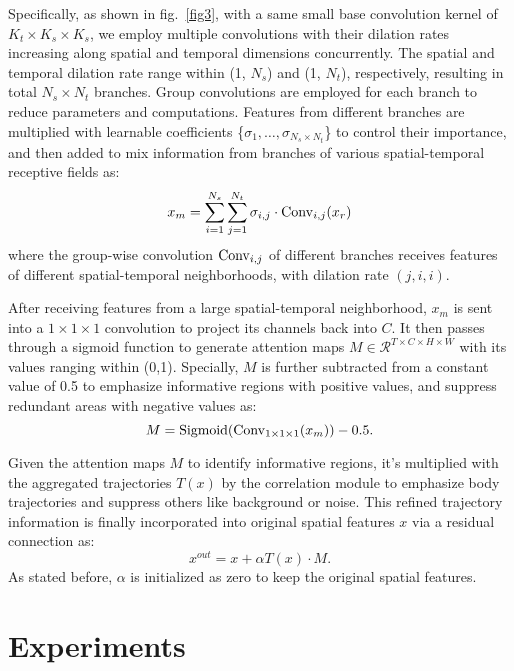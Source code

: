 \documentclass[10pt,twocolumn,letterpaper]{article}
\begin{document}
Specifically, as shown in fig.~\ref{fig3}, with a same small base convolution kernel of $K_t \times K_s \times K_s$, we employ multiple convolutions with their dilation rates increasing along spatial and temporal dimensions concurrently. The spatial and temporal dilation rate range within (1, $N_s$) and (1, $N_t$), respectively, resulting in total $N_s\times N_t$ branches. Group convolutions are employed for each branch to reduce parameters and computations. Features from different branches are multiplied with learnable coefficients \{$\sigma_1, \dots, \sigma_{N_s\times N_t}$\} to control their importance, and then added to mix information from branches of various spatial-temporal receptive fields as:
\begin{equation}
  \label{e6}
    x_m = \sum_{i=1}^{N_s}\sum_{j=1}^{N_t}{\sigma_{i,j} \cdot {\rm Conv}_{i,j}(x_r)}
\end{equation}
where the group-wise convolution ${\rm Conv}_{i,j}$ of different branches receives features of different spatial-temporal neighborhoods, with dilation rate $(j, i, i)$.

After receiving features from a large spatial-temporal neighborhood, $x_m$ is sent into a $1\times 1 \times 1$ convolution to project its channels back into $C$. It then passes through a sigmoid function to generate attention maps $M\in \mathcal{R}^{T \times C\times H \times W}$ with its values ranging within (0,1). Specially, $M$ is further subtracted from a constant value of 0.5 to emphasize informative regions with positive values, and suppress redundant areas with negative values as:
\begin{equation}
  \label{e7}
  M = {\rm Sigmoid}({\rm Conv}_{1\times 1\times 1}(x_m)) -0.5.
\end{equation}

Given the attention maps $M$ to identify informative regions, it's multiplied with the aggregated trajectories $T(x)$ by the correlation module to emphasize body trajectories and suppress others like background or noise. This refined trajectory information is finally incorporated into original spatial features $x$ via a residual connection as:
\begin{equation}
\label{e5}
 x^{out} = x + \alpha T(x) \cdot M.
\end{equation}
As stated before, $\alpha$ is initialized as zero to keep the original spatial features.



\section{Experiments}
\end{document}

